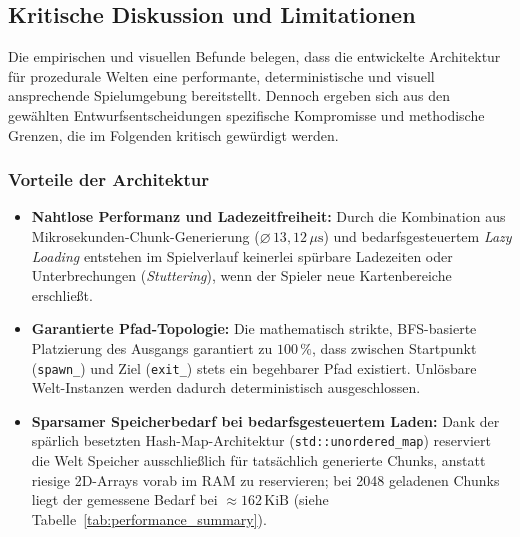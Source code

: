 \documentclass[
  a4paper,
  11pt,
  twoside,
  BCOR=8mm,           %
  headings=big,
  numbers=noenddot,
  listof=totoc,       %
  captions=tableheading,
]{scrreprt}
\begin{document}
\subsection{Kritische Diskussion und Limitationen}
\label{sec:ergebnisse_diskussion}

Die empirischen und visuellen Befunde belegen, dass die entwickelte Architektur für prozedurale Welten eine performante, deterministische und visuell ansprechende Spielumgebung bereitstellt. Dennoch ergeben sich aus den gewählten Entwurfsentscheidungen spezifische Kompromisse und methodische Grenzen, die im Folgenden kritisch gewürdigt werden.

\subsubsection{Vorteile der Architektur}
\begin{itemize}
    \item \textbf{Nahtlose Performanz und Ladezeitfreiheit:} Durch die Kombination aus Mikrosekunden-Chunk-Generierung ($\varnothing\,13{,}12\,\mu\text{s}$) und bedarfsgesteuertem \textit{Lazy Loading} entstehen im Spielverlauf keinerlei spürbare Ladezeiten oder Unterbrechungen (\textit{Stuttering}), wenn der Spieler neue Kartenbereiche erschließt.
    \item \textbf{Garantierte Pfad-Topologie:} Die mathematisch strikte, BFS-basierte Platzierung des Ausgangs garantiert zu $100\,\%$, dass zwischen Startpunkt (\texttt{spawn\_}) und Ziel (\texttt{exit\_}) stets ein begehbarer Pfad existiert. Unlösbare Welt-Instanzen werden dadurch deterministisch ausgeschlossen.
    \item \textbf{Sparsamer Speicherbedarf bei bedarfsgesteuertem Laden:} Dank der spärlich besetzten Hash-Map-Architektur (\texttt{std::unordered\_map}) reserviert die Welt Speicher ausschließlich für tatsächlich generierte Chunks, anstatt riesige 2D-Arrays vorab im RAM zu reservieren; bei 2048 geladenen Chunks liegt der gemessene Bedarf bei $\approx 162\,\text{KiB}$ (siehe Tabelle~\ref{tab:performance_summary}).
\end{itemize}
\end{document}
